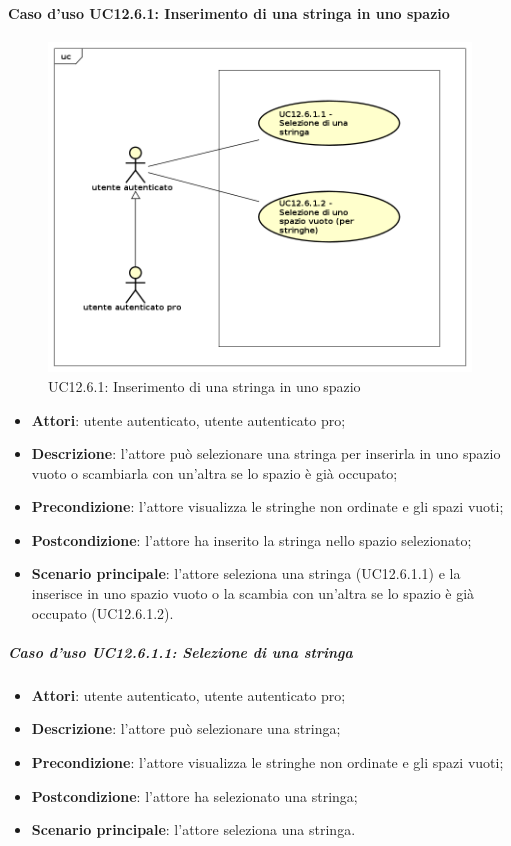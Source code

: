 \newpage
\paragraph{Caso d'uso UC12.6.1: Inserimento di una stringa in uno spazio}
\begin{figure}[h]
	\centering
	\includegraphics[scale=0.5]{UML/UC12_6_1.png}
	\caption{UC12.6.1: Inserimento di una stringa in uno spazio}
\end{figure}
\begin{itemize}
\item \textbf{Attori}: utente autenticato, utente autenticato pro;
\item \textbf{Descrizione}: l'attore può selezionare una stringa per inserirla in uno spazio vuoto o scambiarla con un'altra se lo spazio è già occupato;
\item \textbf{Precondizione}: l'attore visualizza le stringhe non ordinate e gli spazi vuoti;
\item \textbf{Postcondizione}: l'attore ha inserito la stringa nello spazio selezionato;
\item \textbf{Scenario principale}: l'attore seleziona una stringa (UC12.6.1.1) e la inserisce in uno spazio vuoto o la scambia con un'altra se lo spazio è già occupato (UC12.6.1.2).
\end{itemize}

\subparagraph{Caso d'uso UC12.6.1.1: Selezione di una stringa}
\begin{itemize}
\item \textbf{Attori}: utente autenticato, utente autenticato pro;
\item \textbf{Descrizione}: l'attore può selezionare una stringa;
\item \textbf{Precondizione}: l'attore visualizza le stringhe non ordinate e gli spazi vuoti;
\item \textbf{Postcondizione}: l'attore ha selezionato una stringa;
\item \textbf{Scenario principale}: l'attore seleziona una stringa.
\end{itemize}

